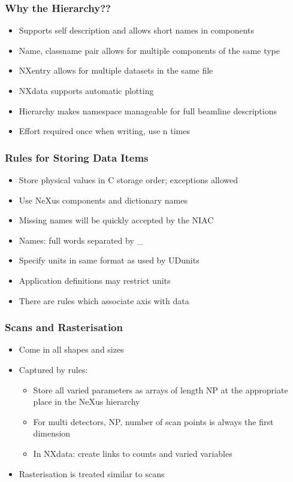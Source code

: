 \documentclass{beamer}
\begin{document}
\begin{frame} \frametitle{Why the Hierarchy??}
\begin{itemize}
\item<1->Supports self description and allows short names in components
\item<2->Name, classname pair allows for multiple components of the same type
\item<3->NXentry allows for multiple datasets in the same file
\item<4->NXdata supports automatic plotting
\item<5->Hierarchy makes namespace manageable for full beamline descriptions
\item<6->Effort required once when writing, use n times
\end{itemize}
\end{frame}

\begin{frame}
\frametitle{Rules for Storing Data Items}
\begin{itemize}
\item Store physical values in C storage order; exceptions allowed
\item Use NeXus components and dictionary names
\item Missing names will be quickly accepted by the NIAC
\item Names: full words separated by \_
\item Specify units in same format as used by UDunits
\item Application definitions may restrict units
\item There are rules which associate axis with data
\end{itemize}
\end{frame}



\begin{frame}
\frametitle{Scans and Rasterisation}
\begin{itemize}
\item Come in all shapes and sizes
\item Captured by rules:
\begin{itemize}
\item Store all varied parameters as arrays of length NP at the appropriate place in the NeXus 
 hierarchy
\item For multi detectors, NP, number of scan points is always the first dimension
\item In NXdata: create links to counts and varied variables
\end{itemize}
\item Rasterisation is treated similar to scans
\end{itemize}
\end{frame}
\end{document}
